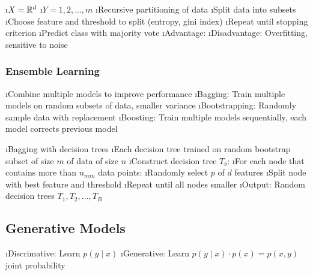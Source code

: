 \bi
\i $X = \mathbb{R}^d$
\i $Y = {1,2,...,m}$
\i Recursive partitioning of data
\i Split data into subsets
\i Choose feature and threshold to split (entropy, gini index)
\i Repeat until stopping criterion
\i Predict class with majority vote
\i Advantage:
\i Disadvantage: Overfitting, sensitive to noise
\ei

\subsubsection{Ensemble Learning}

\bi
\i Combine multiple models to improve performance
\i Bagging: Train multiple models on random subsets of data, smaller variance
\i Bootstrapping: Randomly sample data with replacement
\i Boosting: Train multiple models sequentially, each model corrects previous model
\ei


\bi
\i Bagging with decision trees
\i Each decision tree trained on random bootstrap subset of size $m$ of data of size $n$
\i Construct decision tree $T_b$:
\bi
\i For each node that contains more than $n_{min}$ data points:
\i Randomly select $p$ of $d$ features
\i Split node with best feature and threshold
\i Repeat until all nodes smaller
\ei
\i Output: Random decision trees $T_1, T_2, \ldots, T_B$
\ei

\subsection{Generative Models}

\bi
\i Discrimative: Learn $p(y \mid x)$
\i Generative: Learn $p(y \mid x) \cdot p(x) = p(x, y)$ joint probability
\ei

